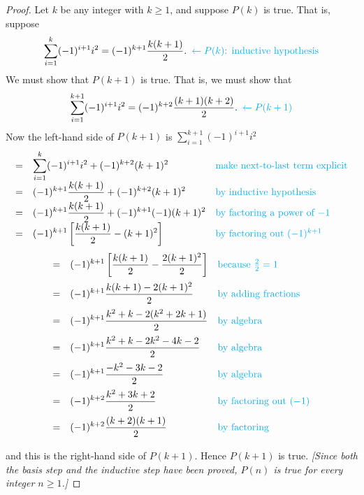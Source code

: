 \documentclass[14pt]{extarticle}
\newcommand{\dps}{\displaystyle}
\newcommand{\from}{\leftarrow}
\newcommand{\cy}{\color{cyan}}
\begin{document}
\begin{proof}
Let $k$ be any integer with $k \geq 1$, and suppose $P(k)$ is true. That is, suppose
\[
\dps \sum_{i=1}^k (-1)^{i+1}i^2 = (-1)^{k+1}\frac{k(k+1)}{2}. \,\,\, {\cy \from P(k) \text{: inductive hypothesis}}
\]
We must show that $P(k + 1)$ is true. That is, we must show that
\[
\dps \sum_{i=1}^{k+1} (-1)^{i+1}i^2 = (-1)^{k+2}\frac{(k+1)(k+2)}{2}. \,\,\,{\cy \from P(k+1)}
\]
Now the left-hand side of $P(k + 1)$ is $\dps \sum_{i=1}^{k+1} (-1)^{i+1}i^2$
\[
\begin{array}{lll}
= & \dps \sum_{i=1}^{k} (-1)^{i+1}i^2 + (-1)^{k+2}(k+1)^2 & \text{\cy make next-to-last term explicit} \\
= & \dps (-1)^{k+1}\frac{k(k+1)}{2} + (-1)^{k+2}(k+1)^2 & \text{\cy by inductive hypothesis} \\
= & \dps (-1)^{k+1}\frac{k(k+1)}{2} + (-1)^{k+1}(-1)(k+1)^2 & \text{\cy by factoring a power of $-1$} \\
= & \dps (-1)^{k+1}\left[\frac{k(k+1)}{2} - (k+1)^2\right] & \text{\cy by factoring out $(-1)^{k+1}$} \\
\end{array}
\]
\[
\begin{array}{lll}
\vspace{0.2cm}
= & \dps (-1)^{k+1}\left[\frac{k(k+1)}{2} -\frac{2(k+1)^2}{2}\right] & \text{\cy because $\frac{2}{2} = 1$} \\
\vspace{0.2cm}
= & \dps (-1)^{k+1}\frac{k(k+1)-2(k+1)^2}{2}  & \text{\cy by adding fractions} \\
\vspace{0.2cm}
= & \dps (-1)^{k+1}\frac{k^2 + k - 2(k^2 + 2k + 1)}{2} & \text{\cy by algebra} \\
\vspace{0.2cm}
= & \dps (-1)^{k+1}\frac{k^2 + k - 2k^2 - 4k -2}{2} & \text{\cy by algebra} \\
\vspace{0.2cm}
= & \dps (-1)^{k+1}\frac{-k^2 - 3k - 2}{2} & \text{\cy by algebra} \\
\vspace{0.2cm}
= & \dps (-1)^{k+2}\frac{k^2 + 3k + 2}{2} & \text{\cy by factoring out $(-1)$} \\
\vspace{0.2cm}
= & \dps (-1)^{k+2}\frac{(k+2)(k+1)}{2} & \text{\cy by factoring}
\end{array}
\]
and this is the right-hand side of $P(k + 1)$. Hence $P(k + 1)$ is true. {\it [Since both the basis step and the inductive step have been proved, $P(n)$ is true for every integer $n \geq 1$.]}
\end{proof}
\end{document}
